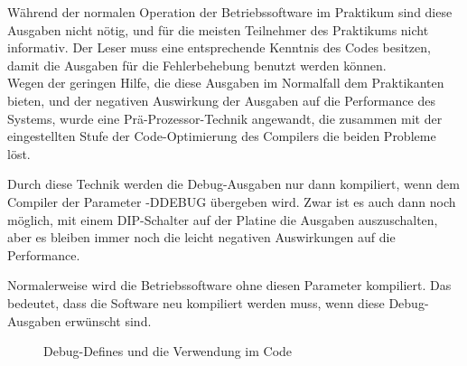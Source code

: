 Während der normalen Operation der Betriebssoftware im Praktikum sind diese Ausgaben
nicht nötig, und für die meisten Teilnehmer des Praktikums nicht informativ.
Der Leser muss eine entsprechende Kenntnis des Codes besitzen, damit die Ausgaben
für die Fehlerbehebung benutzt werden können.\\
Wegen der geringen Hilfe, die diese Ausgaben im Normalfall dem Praktikanten bieten,
und der negativen Auswirkung der Ausgaben auf die Performance des Systems, wurde
eine Prä-Prozessor-Technik angewandt, die zusammen mit der eingestellten Stufe der
Code-Optimierung des Compilers die beiden Probleme löst.

Durch diese Technik werden die Debug-Ausgaben nur dann kompiliert,
wenn dem Compiler der Parameter -DDEBUG übergeben wird. 
Zwar ist es auch dann noch möglich, mit einem DIP-Schalter auf der Platine die Ausgaben
auszuschalten, aber es bleiben immer noch die leicht negativen Auswirkungen auf die Performance.

Normalerweise
wird die Betriebssoftware ohne diesen Parameter kompiliert. Das bedeutet, dass die Software neu kompiliert werden muss, wenn
diese Debug-Ausgaben erwünscht sind.
\begin{figure}[htb]
 \centering
 \caption{\label{debug_trick}Debug-Defines und die Verwendung im Code}
\end{figure}

